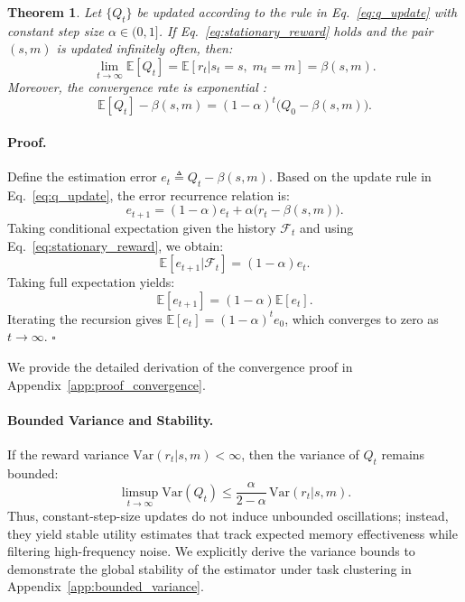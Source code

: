 \documentclass{article}
\theoremstyle{plain}
\newtheorem{theorem}{Theorem}[section]
\theoremstyle{definition}
\theoremstyle{remark}
\begin{document}
\begin{theorem}
\label{thm:ema_convergence}
Let $\{Q_t\}$ be updated according to the rule in Eq.~\ref{eq:q_update} with constant step size $\alpha \in (0,1]$. If Eq.~\ref{eq:stationary_reward} holds and the pair $(s,m)$ is updated infinitely often, then:
\begin{equation}
\label{eq:sm-stable}
\lim_{t \to \infty} \mathbb{E}[Q_t] = \mathbb{E}[r_t | s_t = s,\; m_t = m] = \beta(s,m).
\end{equation}
Moreover, the convergence rate is exponential \citep{sutton2018reinforcement}:
\begin{equation}
\mathbb{E}[Q_t] - \beta(s,m)
=
(1-\alpha)^t\big(Q_0 - \beta(s,m)\big).
\end{equation}
\end{theorem}

\paragraph{Proof.}
Define the estimation error $e_t \triangleq Q_t - \beta(s,m)$. Based on the update rule in Eq.~\ref{eq:q_update}, the error recurrence relation is:
\begin{equation*}
e_{t+1}
=
(1-\alpha)e_t
+
\alpha\big(r_t - \beta(s,m)\big).
\end{equation*}
Taking conditional expectation given the history $\mathcal{F}_t$ and using Eq.~\ref{eq:stationary_reward}, we obtain:
\begin{equation*}
\mathbb{E}[e_{t+1} | \mathcal{F}_t]
=
(1-\alpha)e_t.
\end{equation*}
Taking full expectation yields:
\begin{equation*}
\mathbb{E}[e_{t+1}] = (1-\alpha)\mathbb{E}[e_t].
\end{equation*}
Iterating the recursion gives $\mathbb{E}[e_t] = (1-\alpha)^t e_0$, which converges to zero as $t \to \infty$. \hfill $\square$

We provide the detailed derivation of the convergence proof in Appendix~\ref{app:proof_convergence}.

\paragraph{Bounded Variance and Stability.}
If the reward variance $\mathrm{Var}(r_t | s,m) < \infty$, then the variance of $Q_t$ remains bounded:
\begin{equation}
\limsup_{t \to \infty} \mathrm{Var}(Q_t)
\le
\frac{\alpha}{2-\alpha}\,\mathrm{Var}(r_t | s,m).
\end{equation}
Thus, constant-step-size updates do not induce unbounded oscillations; instead, they yield stable utility estimates that track expected memory effectiveness while filtering high-frequency noise. We explicitly derive the variance bounds to demonstrate the global stability of the estimator under task clustering in Appendix~\ref{app:bounded_variance}.
\end{document}
